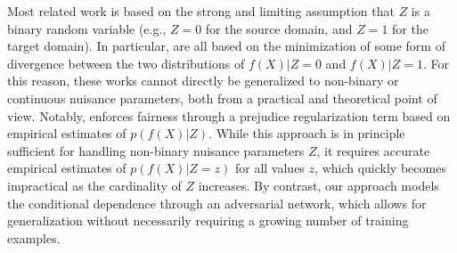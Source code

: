 \documentclass{article}
\theoremstyle{plain}
\begin{document}
Most related
work is based on the strong and limiting assumption that $Z$ is a binary
random variable (e.g., $Z=0$ for the source domain, and
$Z=1$ for the target domain). In particular, \citep{pan2011domain,gong2013connecting,baktashmotlagh2013unsupervised,zemel2013learning,ganin2014unsupervised,ajakan2014domain,EdwardsS15,louizos2015variational}
are all based on the minimization of some form of divergence between the two distributions of
$f(X)|Z=0$ and $f(X)|Z=1$. For this reason,
these works cannot directly be generalized to non-binary or
continuous nuisance parameters, both from a practical and theoretical point of view.
Notably, \cite{kamishima2012fairness} enforces fairness through
a prejudice regularization term based on empirical estimates of $p(f(X)|Z)$.
While this approach is in principle sufficient for handling non-binary
nuisance parameters $Z$, it requires accurate
empirical estimates of $p(f(X)|Z=z)$ for all values $z$, which quickly becomes
impractical as the cardinality of $Z$ increases. By contrast, our approach models the conditional
dependence through an adversarial network, which allows for generalization without
necessarily requiring a growing number of training examples.
\end{document}

